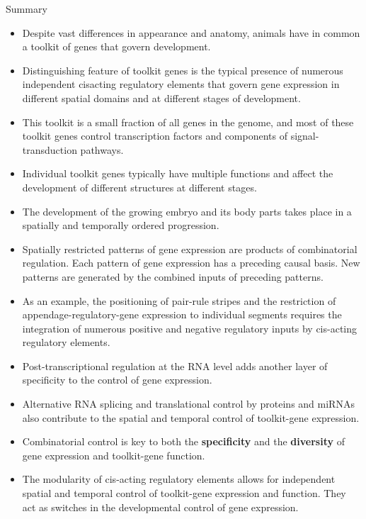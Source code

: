 \documentclass[11pt,dvipsnames,ignorenonframetext,aspectratio=169]{beamer}
\providecommand{\tightlist}{%
  \setlength{\itemsep}{0pt}\setlength{\parskip}{0pt}}
\begin{document}
\begin{frame}{Summary}
\protect\hypertarget{summary}{}

\begin{itemize}
\tightlist
\item
  Despite vast differences in appearance and anatomy, animals have in
  common a toolkit of genes that govern development.
\item
  Distinguishing feature of toolkit genes is the typical presence of
  numerous independent cisacting regulatory elements that govern gene
  expression in different spatial domains and at different stages of
  development.
\item
  This toolkit is a small fraction of all genes in the genome, and most
  of these toolkit genes control transcription factors and components of
  signal-transduction pathways.
\item
  Individual toolkit genes typically have multiple functions and affect
  the development of different structures at different stages.
\item
  The development of the growing embryo and its body parts takes place
  in a spatially and temporally ordered progression.
\end{itemize}

\end{frame}

\begin{frame}{}
\protect\hypertarget{section-8}{}

\begin{itemize}
\tightlist
\item
  Spatially restricted patterns of gene expression are products of
  combinatorial regulation. Each pattern of gene expression has a
  preceding causal basis. New patterns are generated by the combined
  inputs of preceding patterns.
\item
  As an example, the positioning of pair-rule stripes and the
  restriction of appendage-regulatory-gene expression to individual
  segments requires the integration of numerous positive and negative
  regulatory inputs by cis-acting regulatory elements.
\item
  Post-transcriptional regulation at the RNA level adds another layer of
  specificity to the control of gene expression.
\item
  Alternative RNA splicing and translational control by proteins and
  miRNAs also contribute to the spatial and temporal control of
  toolkit-gene expression.
\item
  Combinatorial control is key to both the \textbf{specificity} and the
  \textbf{diversity} of gene expression and toolkit-gene function.
\item
  The modularity of cis-acting regulatory elements allows for
  independent spatial and temporal control of toolkit-gene expression
  and function. They act as switches in the developmental control of
  gene expression.
\end{itemize}

\end{frame}
\end{document}

